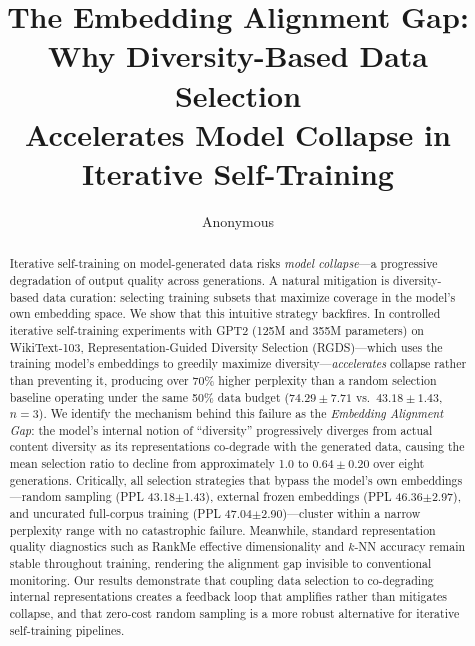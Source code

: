 \documentclass[11pt]{article}
\title{The Embedding Alignment Gap: Why Diversity-Based Data Selection\\Accelerates Model Collapse in Iterative Self-Training}
\author{Anonymous}
\begin{document}
\maketitle

\begin{abstract}
Iterative self-training on model-generated data risks \emph{model collapse}---a progressive degradation of output quality across generations. A natural mitigation is diversity-based data curation: selecting training subsets that maximize coverage in the model's own embedding space. We show that this intuitive strategy backfires. In controlled iterative self-training experiments with GPT2 (125M and 355M parameters) on WikiText-103, Representation-Guided Diversity Selection (RGDS)---which uses the training model's embeddings to greedily maximize diversity---\emph{accelerates} collapse rather than preventing it, producing over 70\% higher perplexity than a random selection baseline operating under the same 50\% data budget ($74.29 \pm 7.71$ vs.\ $43.18 \pm 1.43$, $n{=}3$). We identify the mechanism behind this failure as the \emph{Embedding Alignment Gap}: the model's internal notion of ``diversity'' progressively diverges from actual content diversity as its representations co-degrade with the generated data, causing the mean selection ratio to decline from approximately 1.0 to $0.64 \pm 0.20$ over eight generations. Critically, all selection strategies that bypass the model's own embeddings---random sampling (PPL 43.18$\pm$1.43), external frozen embeddings (PPL 46.36$\pm$2.97), and uncurated full-corpus training (PPL 47.04$\pm$2.90)---cluster within a narrow perplexity range with no catastrophic failure. Meanwhile, standard representation quality diagnostics such as RankMe effective dimensionality and $k$-NN accuracy remain stable throughout training, rendering the alignment gap invisible to conventional monitoring. Our results demonstrate that coupling data selection to co-degrading internal representations creates a feedback loop that amplifies rather than mitigates collapse, and that zero-cost random sampling is a more robust alternative for iterative self-training pipelines.
\end{abstract}
















\end{document}
